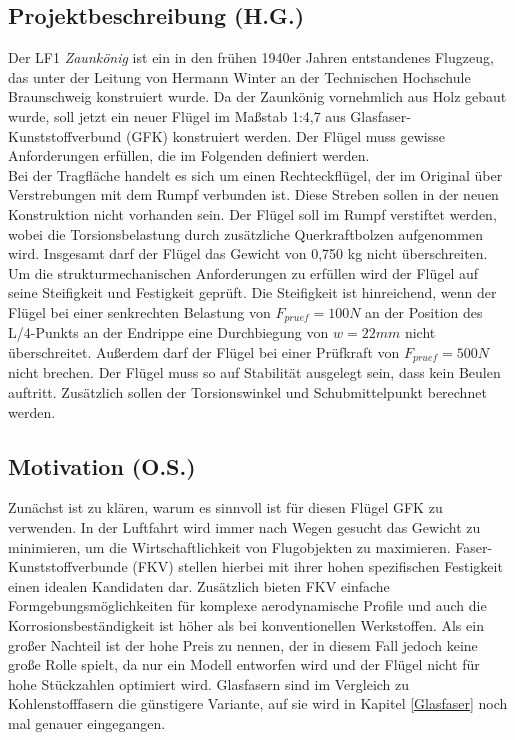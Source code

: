 
\subsection{Projektbeschreibung (H.G.)}
Der LF1 \textit{Zaunkönig} ist ein in den frühen 1940er Jahren entstandenes Flugzeug, das unter der Leitung von Hermann Winter an der Technischen Hochschule Braunschweig konstruiert wurde\cite{item33}. Da der Zaunkönig vornehmlich aus Holz gebaut wurde, soll jetzt ein neuer Flügel im Maßstab 1:4,7 aus Glasfaser-Kunststoffverbund (GFK) konstruiert werden. Der Flügel muss gewisse Anforderungen erfüllen, die im Folgenden definiert werden.\\
Bei der Tragfläche handelt es sich um einen Rechteckflügel, der im Original über Verstrebungen mit dem Rumpf verbunden ist. Diese Streben sollen in der neuen Konstruktion nicht vorhanden sein. Der Flügel soll im Rumpf verstiftet werden, wobei die Torsionsbelastung durch zusätzliche Querkraftbolzen aufgenommen wird. Insgesamt darf der Flügel das Gewicht von 0,750 kg nicht überschreiten.\\
Um die strukturmechanischen Anforderungen zu erfüllen wird der Flügel auf seine Steifigkeit und Festigkeit geprüft. Die Steifigkeit ist hinreichend, wenn der Flügel bei einer senkrechten Belastung von $ F_{pruef}=100N $ an der Position des L/4-Punkts an der Endrippe eine Durchbiegung von $ w=22mm $ nicht überschreitet. Außerdem darf der Flügel bei einer Prüfkraft von $ F_{pruef}=500N $ nicht brechen. Der Flügel muss so auf Stabilität ausgelegt sein, dass kein Beulen auftritt. Zusätzlich sollen der Torsionswinkel und Schubmittelpunkt berechnet werden.
\subsection{Motivation (O.S.)}
Zunächst ist zu klären, warum es sinnvoll ist für diesen Flügel GFK zu verwenden. In der Luftfahrt wird immer nach Wegen gesucht das Gewicht zu minimieren, um die Wirtschaftlichkeit von Flugobjekten zu maximieren. Faser-Kunststoffverbunde (FKV) stellen hierbei mit ihrer hohen spezifischen Festigkeit einen idealen Kandidaten dar. Zusätzlich bieten FKV einfache Formgebungsmöglichkeiten für komplexe aerodynamische Profile und auch die Korrosionsbeständigkeit ist höher als bei konventionellen Werkstoffen. Als ein großer Nachteil ist der hohe Preis zu nennen, der in diesem Fall jedoch keine große Rolle spielt, da nur ein Modell entworfen wird und der Flügel nicht für hohe Stückzahlen optimiert wird. Glasfasern sind im Vergleich zu Kohlenstofffasern die günstigere Variante, auf sie wird in Kapitel \ref{Glasfaser} noch mal genauer eingegangen.
